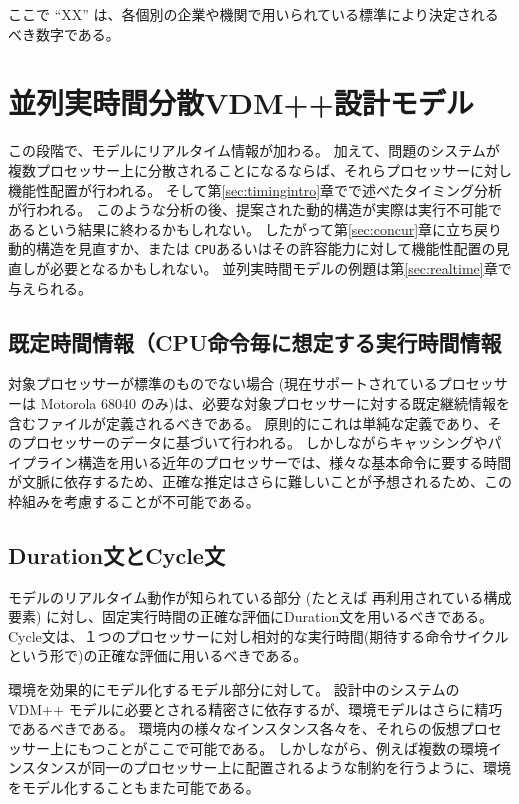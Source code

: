 \documentclass[\pformat,12pt]{jreport}
\begin{document}
ここで ``XX'' は、各個別の企業や機関で用いられている標準により決定されるべき数字である。

\section{並列実時間分散VDM++設計モデル}

この段階で、モデルにリアルタイム情報が加わる。
加えて、問題のシステムが複数プロセッサー上に分散されることになるならば、それらプロセッサーに対し機能性配置が行われる。
そして第\ref{sec:timingintro}章でで述べたタイミング分析が行われる。
このような分析の後、提案された動的構造が実際は実行不可能であるという結果に終わるかもしれない。
したがって第\ref{sec:concur}章に立ち戻り動的構造を見直すか、または \texttt{CPU}あるいはその許容能力に対して機能性配置の見直しが必要となるかもしれない。
並列実時間モデルの例題は第\ref{sec:realtime}章で与えられる。

\subsection{既定時間情報（CPU命令毎に想定する実行時間情報}

対象プロセッサーが標準のものでない場合 (現在サポートされているプロセッサーは Motorola 68040 のみ)は、必要な対象プロセッサーに対する既定継続情報を含むファイルが定義されるべきである。 
原則的にこれは単純な定義であり、そのプロセッサーのデータに基づいて行われる。
しかしながらキャッシングやパイプライン構造を用いる近年のプロセッサーでは、様々な基本命令に要する時間が文脈に依存するため、正確な推定はさらに難しいことが予想されるため、この枠組みを考慮することが不可能である。

\subsection{Duration文とCycle文}

モデルのリアルタイム動作が知られている部分 (たとえば 再利用されている構成要素) に対し、固定実行時間の正確な評価にDuration文を用いるべきである。
Cycle文は、１つのプロセッサーに対し相対的な実行時間(期待する命令サイクルという形で)の正確な評価に用いるべきである。

環境を効果的にモデル化するモデル部分に対して。
設計中のシステムの VDM++ モデルに必要とされる精密さに依存するが、環境モデルはさらに精巧であるべきである。
環境内の様々なインスタンス各々を、それらの仮想プロセッサー上にもつことがここで可能である。
しかしながら、例えば複数の環境インスタンスが同一のプロセッサー上に配置されるような制約を行うように、環境をモデル化することもまた可能である。
\end{document}
